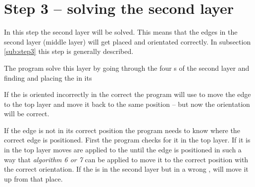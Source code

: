 \section{Step 3 -- solving the second layer}
In this step the second layer will be solved. 
This means that the edges in the second layer (middle layer) will get placed and orientated correctly. 
In subsection \ref{sub:step3} this step is generally described. 

The program solve this layer by going through the four \cubicle{}s of the second layer and finding and placing the \cpiece{} in its \cubicle{}

If the \cpiece is oriented incorrectly in the correct \cubicle{} the program will use   to move the edge \cpiece{} to the top layer and move it back to the same position -- but now the orientation will be correct. 

If the edge \cpiece{} is not in its correct position the program needs to know where the correct edge \cpiece{} is positioned. First the program checks for it in the top layer. 
If it is in the top layer  moves are applied to the \rubik{} until the edge \cpiece{} is positioned in such a way that \textit{algorithm 6 or 7} can be applied to move it to the correct position with the correct orientation. 
If the \cpiece{} is in the second layer but in a wrong \cubicle{},  will move it up from that place. 
